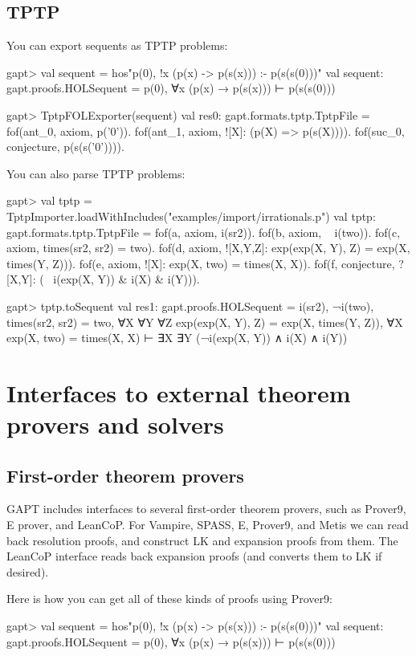 \documentclass[a4paper,11pt]{book}
\begin{document}
\section{TPTP}
You can export sequents as TPTP problems:
\begin{clilisting}
gapt> val sequent = hos"p(0), !x (p(x) -> p(s(x))) :- p(s(s(0)))"
val sequent: gapt.proofs.HOLSequent = p(0), ∀x (p(x) → p(s(x))) ⊢ p(s(s(0)))

gapt> TptpFOLExporter(sequent)
val res0: gapt.formats.tptp.TptpFile = fof(ant_0, axiom, p('0')).
fof(ant_1, axiom, ![X]: (p(X) => p(s(X)))).
fof(suc_0, conjecture, p(s(s('0')))).

\end{clilisting}

You can also parse TPTP problems:
\begin{clilisting}
gapt> val tptp = TptpImporter.loadWithIncludes("examples/import/irrationals.p")
val tptp: gapt.formats.tptp.TptpFile = fof(a, axiom, i(sr2)).
fof(b, axiom, ~ i(two)).
fof(c, axiom, times(sr2, sr2) = two).
fof(d, axiom, ![X,Y,Z]: exp(exp(X, Y), Z) = exp(X, times(Y, Z))).
fof(e, axiom, ![X]: exp(X, two) = times(X, X)).
fof(f, conjecture, ?[X,Y]: (~ i(exp(X, Y)) & i(X) & i(Y))).

gapt> tptp.toSequent
val res1: gapt.proofs.HOLSequent = i(sr2),
¬i(two),
times(sr2, sr2) = two,
∀X ∀Y ∀Z exp(exp(X, Y), Z) = exp(X, times(Y, Z)),
∀X exp(X, two) = times(X, X)
⊢
∃X ∃Y (¬i(exp(X, Y)) ∧ i(X) ∧ i(Y))

\end{clilisting}

\chapter{Interfaces to external theorem provers and solvers}


\section{First-order theorem provers}\label{sec:fol_provers}

GAPT includes interfaces to several first-order theorem provers, such as
Prover9, E prover, and LeanCoP.  For Vampire, SPASS, E, Prover9, and Metis we can read back
resolution proofs, and construct LK and expansion proofs from them.  The
LeanCoP interface reads back expansion proofs (and converts them to LK if desired).

Here is how you can get all of these kinds of proofs using Prover9:
\begin{clilisting}
gapt> val sequent = hos"p(0), !x (p(x) -> p(s(x))) :- p(s(s(0)))"
val sequent: gapt.proofs.HOLSequent = p(0), ∀x (p(x) → p(s(x))) ⊢ p(s(s(0)))

\end{clilisting}
\end{document}
